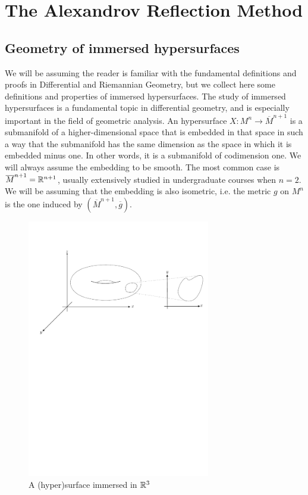 \chapter{The Alexandrov Reflection Method}


\section{Geometry of immersed hypersurfaces}


We will be assuming the reader is familiar with the fundamental definitions and proofs in Differential and Riemannian Geometry, but we collect here some definitions and properties of immersed hypersurfaces. 
The study of immersed hypersurfaces is a fundamental topic in differential geometry, and is especially important in the field of geometric analysis. An hypersurface $X: M^n \rightarrow \overline{M}^{n+1}$ is a submanifold of a higher-dimensional space that is embedded in that space in such a way that the submanifold has the same dimension as the space in which it is embedded minus one. In other words, it is a submanifold of codimension one. We will always assume the embedding to be smooth. The most common case is $\overline{M}^{n+1}=\mathbb{R}^{n+1}$, usually extensively studied in undergraduate courses when $n=2$. We will be assuming that the embedding is also isometric, i.e. the metric $g$ on $M^n$ is the one induced by $(\overline{M}^{n+1}, \overline{g})$. 

\begin{figure}
	\centering
	\includegraphics[width=0.713\textwidth]{figures/1_embedded_manifold}
	\caption{A (hyper)surface immersed in $\mathbb{R}^3$}
\end{figure}

